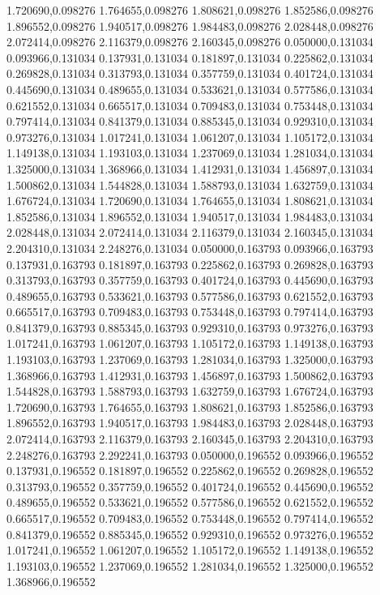 1.720690,0.098276
1.764655,0.098276
1.808621,0.098276
1.852586,0.098276
1.896552,0.098276
1.940517,0.098276
1.984483,0.098276
2.028448,0.098276
2.072414,0.098276
2.116379,0.098276
2.160345,0.098276
0.050000,0.131034
0.093966,0.131034
0.137931,0.131034
0.181897,0.131034
0.225862,0.131034
0.269828,0.131034
0.313793,0.131034
0.357759,0.131034
0.401724,0.131034
0.445690,0.131034
0.489655,0.131034
0.533621,0.131034
0.577586,0.131034
0.621552,0.131034
0.665517,0.131034
0.709483,0.131034
0.753448,0.131034
0.797414,0.131034
0.841379,0.131034
0.885345,0.131034
0.929310,0.131034
0.973276,0.131034
1.017241,0.131034
1.061207,0.131034
1.105172,0.131034
1.149138,0.131034
1.193103,0.131034
1.237069,0.131034
1.281034,0.131034
1.325000,0.131034
1.368966,0.131034
1.412931,0.131034
1.456897,0.131034
1.500862,0.131034
1.544828,0.131034
1.588793,0.131034
1.632759,0.131034
1.676724,0.131034
1.720690,0.131034
1.764655,0.131034
1.808621,0.131034
1.852586,0.131034
1.896552,0.131034
1.940517,0.131034
1.984483,0.131034
2.028448,0.131034
2.072414,0.131034
2.116379,0.131034
2.160345,0.131034
2.204310,0.131034
2.248276,0.131034
0.050000,0.163793
0.093966,0.163793
0.137931,0.163793
0.181897,0.163793
0.225862,0.163793
0.269828,0.163793
0.313793,0.163793
0.357759,0.163793
0.401724,0.163793
0.445690,0.163793
0.489655,0.163793
0.533621,0.163793
0.577586,0.163793
0.621552,0.163793
0.665517,0.163793
0.709483,0.163793
0.753448,0.163793
0.797414,0.163793
0.841379,0.163793
0.885345,0.163793
0.929310,0.163793
0.973276,0.163793
1.017241,0.163793
1.061207,0.163793
1.105172,0.163793
1.149138,0.163793
1.193103,0.163793
1.237069,0.163793
1.281034,0.163793
1.325000,0.163793
1.368966,0.163793
1.412931,0.163793
1.456897,0.163793
1.500862,0.163793
1.544828,0.163793
1.588793,0.163793
1.632759,0.163793
1.676724,0.163793
1.720690,0.163793
1.764655,0.163793
1.808621,0.163793
1.852586,0.163793
1.896552,0.163793
1.940517,0.163793
1.984483,0.163793
2.028448,0.163793
2.072414,0.163793
2.116379,0.163793
2.160345,0.163793
2.204310,0.163793
2.248276,0.163793
2.292241,0.163793
0.050000,0.196552
0.093966,0.196552
0.137931,0.196552
0.181897,0.196552
0.225862,0.196552
0.269828,0.196552
0.313793,0.196552
0.357759,0.196552
0.401724,0.196552
0.445690,0.196552
0.489655,0.196552
0.533621,0.196552
0.577586,0.196552
0.621552,0.196552
0.665517,0.196552
0.709483,0.196552
0.753448,0.196552
0.797414,0.196552
0.841379,0.196552
0.885345,0.196552
0.929310,0.196552
0.973276,0.196552
1.017241,0.196552
1.061207,0.196552
1.105172,0.196552
1.149138,0.196552
1.193103,0.196552
1.237069,0.196552
1.281034,0.196552
1.325000,0.196552
1.368966,0.196552
